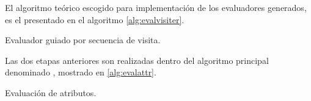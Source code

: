 El algoritmo teórico escogido para implementación de los evaluadores generados, es el presentado en el algoritmo \ref{alg:evalvisiter}.

\begin{algorithm}[!ht]

\vspace{-0.5cm}
\caption{\label{alg:evalvisiter}Evaluador guiado por secuencia de visita.}
\end{algorithm}

Las dos etapas anteriores son realizadas dentro del algoritmo principal denominado , mostrado en \ref{alg:evalattr}.

\begin{algorithm}[!ht]

\vspace{-0.5cm}
\caption{\label{alg:evalattr}Evaluación de atributos.}
\end{algorithm}